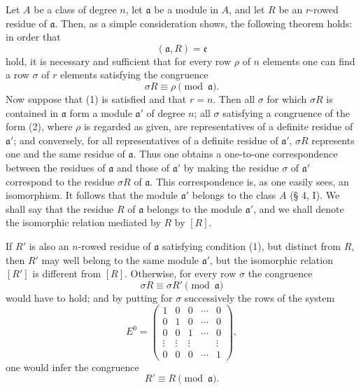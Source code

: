 Let $A$ be a class of degree $n$, let $\mathfrak a$ be a module in $A$, and let $R$ be an $r$-rowed residue of $\mathfrak a$. Then, as a simple consideration shows, the following theorem holds: in order that
\begin{equation}
 (\mathfrak a,R)=\mathfrak e
\tag{1}
\end{equation}
hold, it is necessary and sufficient that for every row $\rho$ of $n$ elements one can find a row $\sigma$ of $r$ elements satisfying the congruence
\begin{equation}
 \sigma R\equiv\rho\pmod{\mathfrak a}.
\tag{2}
\end{equation}
Now suppose that (1) is satisfied and that $r=n$. Then all $\sigma$ for which $\sigma R$ is contained in $\mathfrak a$ form a module $\mathfrak a'$ of degree $n$; all $\sigma$ satisfying a congruence of the form (2), where $\rho$ is regarded as given, are representatives of a definite residue of $\mathfrak a'$; and conversely, for all representatives of a definite residue of $\mathfrak a'$, $\sigma R$ represents one and the same residue of $\mathfrak a$. Thus one obtains a one-to-one correspondence between the residues of $\mathfrak a$ and those of $\mathfrak a'$ by making the residue $\sigma$ of $\mathfrak a'$ correspond to the residue $\sigma R$ of $\mathfrak a$. This correspondence is, as one easily sees, an isomorphism. It follows that the module $\mathfrak a'$ belongs to the class $A$ (§ 4, I). We shall say that the residue $R$ of $\mathfrak a$ belongs to the module $\mathfrak a'$, and we shall denote the isomorphic relation mediated by $R$ by $[R]$.

If $R'$ is also an $n$-rowed residue of $\mathfrak a$ satisfying condition (1), but distinct from $R$, then $R'$ may well belong to the same module $\mathfrak a'$, but the isomorphic relation $[R']$ is different from $[R]$. Otherwise, for every row $\sigma$ the congruence
\[
 \sigma R\equiv\sigma R'\pmod{\mathfrak a}
\]
would have to hold; and by putting for $\sigma$ successively the rows of the system
\[
 E^0=\begin{pmatrix}
 1&0&0&\cdots&0\\
 0&1&0&\cdots&0\\
 0&0&1&\cdots&0\\
 \vdots&\vdots&\vdots&&\vdots\\
 0&0&0&\cdots&1
 \end{pmatrix},
\]
one would infer the congruence
\[
 R'\equiv R\pmod{\mathfrak a}.
\]

